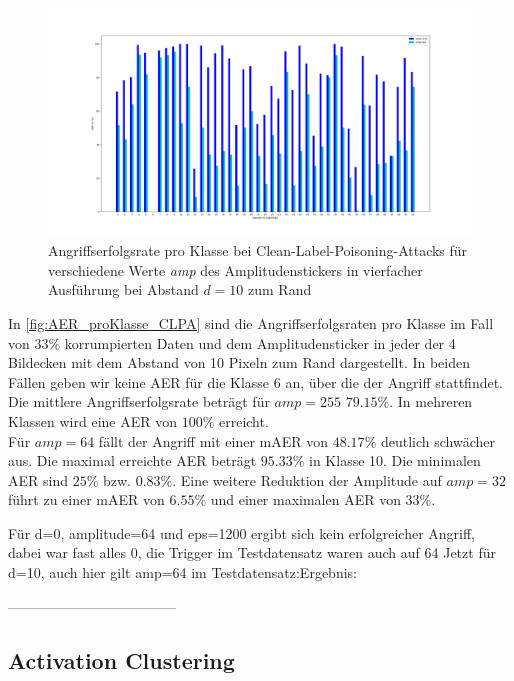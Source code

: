\documentclass[twoside, 11pt,a4paper]{article}
\numberwithin{equation}{section}
\begin{document}
	\begin{figure}[h]
		\begin{center}
			\includegraphics[width=0.5\textheight]{Vergleich_AER_CLPA.png}
			\caption{Angriffserfolgsrate pro Klasse bei Clean-Label-Poisoning-Attacks für verschiedene Werte \textit{amp} des Amplitudenstickers in vierfacher Ausführung bei Abstand $d=10$ zum Rand}
			\label{fig:AER_proKlasse_CLPA}
		\end{center}
	\end{figure}
	
	In \autoref{fig:AER_proKlasse_CLPA} sind die Angriffserfolgsraten pro Klasse im Fall von $33 \%$ korrumpierten Daten und dem Amplitudensticker in jeder der 4 Bildecken mit dem Abstand von 10 Pixeln zum Rand dargestellt. In beiden Fällen geben wir keine AER für die Klasse 6 an, über die der Angriff stattfindet.
	Die mittlere Angriffserfolgsrate beträgt für $amp=255$ $79.15 \%$. In mehreren Klassen wird eine AER von $100 \%$ erreicht.\\
	Für $amp=64$ fällt der Angriff mit einer mAER von $48.17 \%$ deutlich schwächer aus. Die maximal erreichte AER beträgt $95.33 \%$ in Klasse 10. Die minimalen AER sind $25 \%$ bzw. $0.83 \% $.
	Eine weitere Reduktion der Amplitude auf $amp=32$ führt zu einer mAER von $6.55 \%$ und einer maximalen AER von $33 \%$.
	
	Für d=0, amplitude=64 und eps=1200 ergibt sich kein erfolgreicher Angriff, dabei war fast alles 0, die Trigger im Testdatensatz waren auch auf 64
	Jetzt für d=10, auch hier gilt amp=64 im Testdatensatz:Ergebnis:
	
	
	------------------------------------
	\subsection{Activation Clustering}
\end{document}

